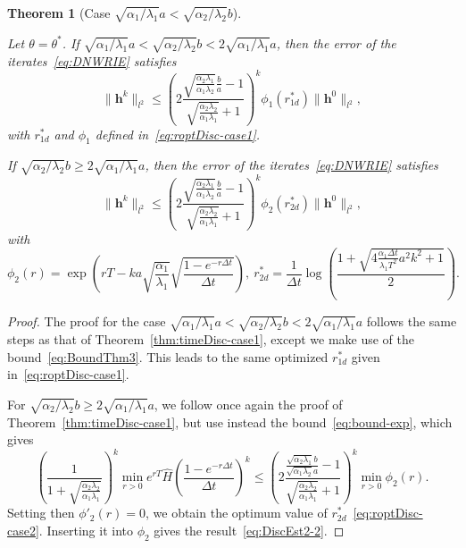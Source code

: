 \documentclass[10pt,a4paper]{amsart}
\newtheorem{theorem}{Theorem}
\begin{document}
\begin{theorem}[Case $\sqrt{\alpha_1/\lambda_1} a < \sqrt{\alpha_2/\lambda_2} b$]\label{thm:timeDisc-case2}

Let $\theta = \theta^*$. If $\sqrt{\alpha_1/\lambda_1} a < \sqrt{\alpha_2/\lambda_2} b < 2\sqrt{\alpha_1/\lambda_1} a$, then the error of the iterates~\eqref{eq:DNWRIE} satisfies
\begin{equation}\label{eq:DiscEst2-1}
\|\boldsymbol{h}^k\|_{l^2} \leq \left(2\frac{\sqrt{\frac{\alpha_2 \lambda_1}{\alpha_1\lambda_2}}\frac{b}{a} -1}{\sqrt{\frac{\alpha_2 \lambda_2}{\alpha_1\lambda_1}} + 1} \right)^k \phi_1(r^*_{1d}) \|\boldsymbol{h}^0\|_{l^2},
\end{equation}
with $r^*_{1d}$ and $\phi_1$ defined in~\eqref{eq:roptDisc-case1}. 

If $\sqrt{\alpha_2/\lambda_2} b \geq 2\sqrt{\alpha_1/\lambda_1} a$, then the error of the iterates~\eqref{eq:DNWRIE} satisfies
\begin{equation}\label{eq:DiscEst2-2}
\|\boldsymbol{h}^k\|_{l^2} \leq \left(2\frac{\sqrt{\frac{\alpha_2 \lambda_1}{\alpha_1\lambda_2}}\frac{b}{a} - 1}{\sqrt{\frac{\alpha_2 \lambda_2}{\alpha_1\lambda_1}}+1} \right)^k 
\phi_2(r_{2d}^*) \|\boldsymbol{h}^0\|_{l^2},
\end{equation}
with 
\begin{equation}\label{eq:roptDisc-case2}
\phi_2(r) = \exp\left( r T  - ka\sqrt{\frac{\alpha_1}{\lambda_1}}\sqrt{\frac{1-e^{-r \Delta t}}{\Delta t}}\right), \  r^*_{2d} = \frac1{\Delta t}\log\left(\frac{1 + \sqrt{4\frac{\alpha_1  \Delta t}{ \lambda_1 T^2}a^2 k^2 + 1}}{2}\right).
\end{equation}
\end{theorem}

\begin{proof}
The proof for the case $\sqrt{\alpha_1/\lambda_1} a < \sqrt{\alpha_2/\lambda_2} b < 2\sqrt{\alpha_1/\lambda_1} a$ follows the same steps as that of Theorem~\ref{thm:timeDisc-case1}, except we make use of the bound~\eqref{eq:BoundThm3}. This leads to the same optimized $r^*_{1d}$ given in~\eqref{eq:roptDisc-case1}.
	

For $\sqrt{\alpha_2/\lambda_2} b \geq 2\sqrt{\alpha_1/\lambda_1} a$, we follow once again the proof of Theorem~\ref{thm:timeDisc-case1}, but use instead  the bound~\eqref{eq:bound-exp}, which gives
\[\left(\frac1{1+\sqrt{\frac{\alpha_2\lambda_2}{\alpha_1\lambda_1}}}\right)^k\min_{r>0}e^{rT} \hat H \left(\frac{1-e^{-r \Delta t}}{\Delta t}\right)^k 
\leq \left(2\frac{\frac{\sqrt{\alpha_2 \lambda_1}b}{\sqrt{\alpha_1\lambda_2}a} - 1}{\sqrt{\frac{\alpha_2 \lambda_2}{\alpha_1\lambda_1}}+1} \right)^k \min_{r > 0} \phi_2(r).\]
Setting then $\phi'_2(r)=0$, we obtain the optimum value of $r^*_{2d}$~\eqref{eq:roptDisc-case2}. Inserting it into $\phi_2$ gives the result~\eqref{eq:DiscEst2-2}.
\end{proof}
\end{document}
